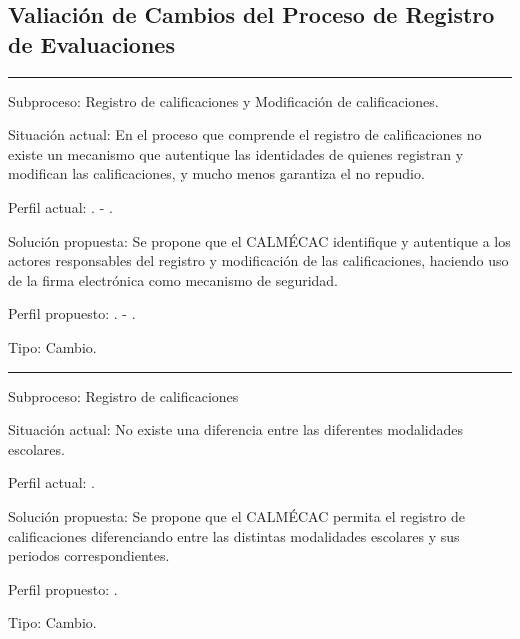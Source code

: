 \subsection{Valiación de Cambios del Proceso de Registro de Evaluaciones}
\label{sec:PF-GE:validacion}

\hrule
\vspace{0.2cm}
\begin{Cdescription}
	\item[Subproceso:] Registro de calificaciones y Modificación de calificaciones.	
	\item[Situación actual:]En el proceso que comprende el registro de calificaciones no existe un mecanismo que autentique las identidades de quienes registran y modifican las calificaciones,  y mucho menos garantiza el no repudio.  
	\item[Perfil actual:] . - .
	\item[Solución propuesta:] Se propone que el CALMÉCAC identifique y autentique a los actores responsables del registro y modificación de las calificaciones, haciendo uso de la firma electrónica como mecanismo de seguridad.
	\item[Perfil propuesto:] . - .
	\item[Tipo:] Cambio.\\
\end{Cdescription}

\hrule
\vspace{0.2cm}
\begin{Cdescription}
	
	\item[Subproceso:] Registro de calificaciones
	\item[Situación actual:]No existe una diferencia entre las diferentes modalidades escolares.
	\item[Perfil actual:] .
	\item[Solución propuesta:] Se propone que el CALMÉCAC permita el registro de calificaciones diferenciando entre las distintas modalidades escolares y sus periodos correspondientes.
	\item[Perfil propuesto:] .
	\item[Tipo:] Cambio.\\
	
\end{Cdescription}

